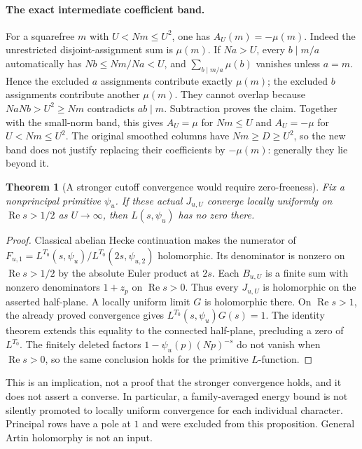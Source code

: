 \documentclass[11pt]{article}
\newtheorem{theorem}{Theorem}[section]
\theoremstyle{definition}\newtheorem{definition}[theorem]{Definition}
\theoremstyle{remark}\newtheorem{remark}[theorem]{Remark}
\begin{document}
\paragraph{The exact intermediate coefficient band.}
For a squarefree $m$ with $U<Nm\le U^2$, one has $A_U(m)=-\mu(m)$.
Indeed the unrestricted disjoint-assignment sum is $\mu(m)$. If $Na>U$,
every $b\mid m/a$ automatically has $Nb\le Nm/Na<U$, and
$\sum_{b\mid m/a}\mu(b)$ vanishes unless $a=m$. Hence the excluded
$a$ assignments contribute exactly $\mu(m)$; the excluded $b$
assignments contribute another $\mu(m)$. They cannot overlap because
$NaNb>U^2\ge Nm$ contradicts $ab\mid m$. Subtraction proves the claim.
Together with the small-norm band, this gives $A_U=\mu$ for $Nm\le U$
and $A_U=-\mu$ for $U<Nm\le U^2$. The original smoothed columns have
$Nm\ge D\ge U^2$, so the new band does not justify replacing their
coefficients by $-\mu(m)$: generally they lie beyond it.

\begin{theorem}[A stronger cutoff convergence would require zero-freeness]
\label{rc:boundary}
Fix a nonprincipal primitive $\psi_u$. If these actual $J_{u,U}$
converge locally uniformly on $\operatorname{Re}s>1/2$ as
$U\longrightarrow\infty$, then $L(s,\psi_u)$ has no zero there.
\end{theorem}
\begin{proof}
Classical abelian Hecke continuation makes the numerator of
$F_{u,1}=L^{T_0}(s,\psi_u)/L^{T_0}(2s,\psi_{u,2})$ holomorphic.
Its denominator is nonzero on $\operatorname{Re}s>1/2$ by the
absolute Euler product at $2s$. Each $B_{u,U}$ is a finite sum with
nonzero denominators $1+z_p$ on $\operatorname{Re}s>0$.
Thus every $J_{u,U}$ is holomorphic on the asserted half-plane.
A locally uniform limit $G$ is holomorphic there. On
$\operatorname{Re}s>1$, the already proved convergence gives
$L^{T_0}(s,\psi_u)G(s)=1$. The identity theorem extends this equality
to the connected half-plane, precluding a zero of $L^{T_0}$.
The finitely deleted factors $1-\psi_u(p)(Np)^{-s}$ do not vanish
when $\operatorname{Re}s>0$, so the same conclusion holds for the
primitive $L$-function.
\end{proof}
This is an implication, not a proof that the stronger convergence holds,
and it does not assert a converse. In particular, a family-averaged energy
bound is not silently promoted to locally uniform convergence for each
individual character. Principal rows have a pole at $1$ and were excluded
from this proposition. General Artin holomorphy is not an input.
\end{document}
